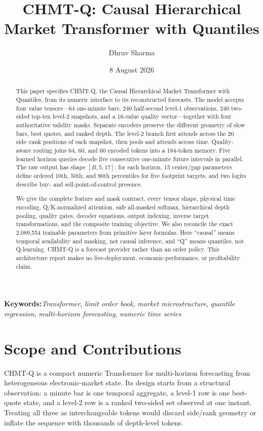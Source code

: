 \documentclass[10pt,letterpaper]{article}
\title{\textbf{CHMT-Q: Causal Hierarchical Market Transformer with Quantiles}}
\author[1]{Dhruv Sharma}
\affil[1]{Independent Researcher\\\texttt{dhruv4jaipur@gmail.com}}
\date{8 August 2026}
\numberwithin{equation}{section}
\newcommand{\keywords}[1]{\par\addvspace{\baselineskip}\noindent\textbf{Keywords:}\enspace#1}
\theoremstyle{definition}
\theoremstyle{remark}
\begin{document}
\maketitle
\thispagestyle{fancy}

\begin{abstract}
This paper specifies CHMT-Q, the Causal Hierarchical Market Transformer with
Quantiles, from its numeric interface to its reconstructed forecasts. The model
accepts four value tensors---64 one-minute bars, 240 half-second level-1
observations, 240 two-sided top-ten level-2 snapshots, and a 16-value quality
vector---together with four authoritative validity masks. Separate encoders
preserve the different geometry of slow bars, best quotes, and ranked depth.
The level-2 branch first attends across the 20 side--rank positions of each
snapshot, then pools and attends across time. Quality-aware routing joins 64,
60, and 60 encoded tokens into a 184-token memory. Five learned horizon queries
decode five consecutive one-minute future intervals in parallel. The raw output
has shape $[B,5,17]$: for each horizon, 15 center/gap parameters define ordered
10th, 50th, and 90th percentiles for five footprint targets, and two logits
describe buy- and sell-point-of-control presence.

We give the complete feature and mask contract, every tensor shape, physical
time encoding, Q/K-normalized attention, safe all-masked softmax, hierarchical
depth pooling, quality gates, decoder equations, output indexing, inverse target
transformations, and the composite training objective. We also reconcile the
exact 2,089,554 trainable parameters from primitive layer formulas. Here
``causal'' means temporal availability and masking, not causal inference, and
``Q'' means quantiles, not Q-learning. CHMT-Q is a forecast provider rather
than an order policy. This architecture report makes no live-deployment,
economic-performance, or profitability claim.
\end{abstract}

\keywords{\emph{Transformer}, \emph{limit order book},
\emph{market microstructure}, \emph{quantile regression},
\emph{multi-horizon forecasting}, \emph{numeric time series}}

\section{Scope and Contributions}

CHMT-Q is a compact numeric Transformer for multi-horizon forecasting from
heterogeneous electronic-market state. Its design starts from a structural
observation: a minute bar is one temporal aggregate, a level-1 row is one
best-quote state, and a level-2 row is a ranked two-sided set observed at one
instant. Treating all three as interchangeable tokens would discard side/rank
geometry or inflate the sequence with thousands of depth-level tokens.
\end{document}
